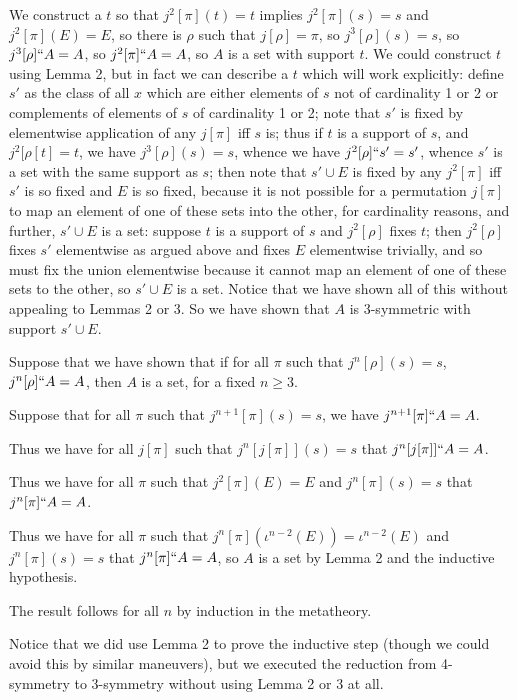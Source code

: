 \documentclass[12pt]{article}
\begin{document}
\begin{description}
We construct a $t$ so that $j^2[\pi](t)=t$ implies $j^2[\pi](s)=s$ and $j^2[\pi](E)=E$, so there is $\rho$ such
that $j[\rho]=\pi$, so  $j^3[\rho](s)=s$, so $j^3[\rho]``A =A$, so $j^2[\pi]``A=A$, so $A$ is a set with support $t$.  We could construct $t$ using Lemma 2, but in fact we can describe a $t$ which will work explicitly:  define $s'$ as the class of all $x$ which are either elements of $s$ not of cardinality 1 or 2 or complements of elements of $s$ of cardinality 1 or 2;  note that $s'$ is fixed by elementwise application of any $j[\pi]$ iff $s$ is; thus if $t$ is a support of  $s$, and $j^2[\rho[t]=t$, we have $j^3[\rho](s) = s$, whence we have $j^2[\rho]``s' = s'$, whence $s'$ is a set with the same support as $s$;  then note that $s' \cup E$ is fixed by any $j^2[\pi]$ iff $s'$ is so fixed and $E$ is so fixed, because it is not possible for a permutation $j[\pi]$ to map an element of one of these sets into the other, for cardinality reasons, and further, $s' \cup E$ is a set:  suppose $t$ is a support of $s$ and $j^2[\rho]$ fixes $t$;  then $j^2[\rho]$ fixes $s'$ elementwise as argued above and fixes $E$ elementwise trivially, and so must fix the union elementwise because it cannot map an element of one of these sets to the other, so $s'\cup E$ is a set.  Notice that we have shown all of this without appealing to Lemmas 2 or 3.  So we have shown that $A$ is 3-symmetric with support $s' \cup E$.

Suppose that we have shown that if for all $\pi$ such that $j^n[\rho](s)=s$, $j^n[\rho]``A =A$, then $A$ is a set, for a fixed $n \geq 3$.

Suppose that for all $\pi$ such that $j^{n+1}[\pi](s)=s$, we have $j^{n+1}[\pi]``A =A$.

Thus we have for all $j[\pi]$ such that $j^n[j[\pi]](s) = s$ that $j^n[j[\pi]]``A = A$.

Thus we have for all $\pi$ such that $j^2[\pi](E) = E$ and $j^n[\pi](s)=s$ that $ j^n[\pi]``A = A$.

Thus we have for all $\pi$ such that $j^n[\pi](\iota^{n-2}(E)) = \iota^{n-2}(E)$ and $j^n[\pi](s)=s$ that  $ j^n[\pi]``A = A$, so $A$ is a set by Lemma 2 and the inductive hypothesis.

The result follows for all $n$ by induction in the metatheory.



\end{description}

Notice that we did use Lemma 2 to prove the inductive step (though we could avoid this by similar maneuvers), but we executed the reduction from 4-symmetry to 3-symmetry without using Lemma 2 or 3 at all.
\end{document}
